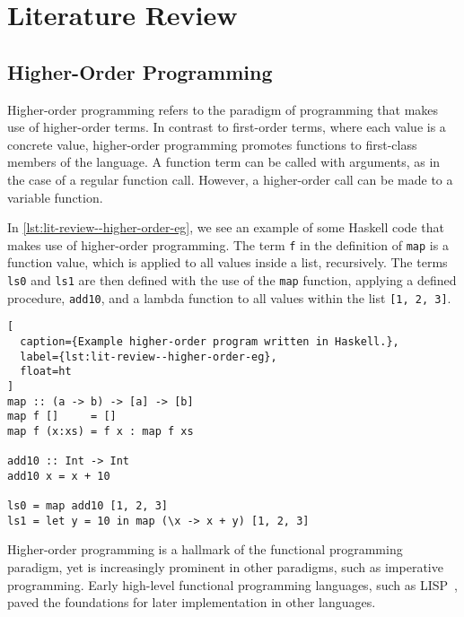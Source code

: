 \clearpage

\def\chaptertitle{Literature Review}

\lhead{\emph{\chaptertitle}}

\chapter{\chaptertitle}
\label{ch:lit-review}

\section{Higher-Order Programming}
\label{sec:lit-review--higher-order-programming}

Higher-order programming refers to the paradigm of programming that makes use of higher-order terms. In contrast to first-order terms, where each value is a concrete value, higher-order programming promotes functions to first-class members of the language. A function term can be called with arguments, as in the case of a regular function call. However, a higher-order call can be made to a variable function. 

In \cref{lst:lit-review--higher-order-eg}, we see an example of some Haskell code that makes use of higher-order programming. The term \texttt{f} in the definition of \texttt{map} is a function value, which is applied to all values inside a list, recursively. The terms \texttt{ls0} and \texttt{ls1} are then defined with the use of the \texttt{map} function, applying a defined procedure, \texttt{add10}, and a lambda function to all values within the list \texttt{[1, 2, 3]}.

\begin{lstlisting}[
  caption={Example higher-order program written in Haskell.},
  label={lst:lit-review--higher-order-eg},
  float=ht
]
map :: (a -> b) -> [a] -> [b]
map f []     = []
map f (x:xs) = f x : map f xs

add10 :: Int -> Int
add10 x = x + 10

ls0 = map add10 [1, 2, 3]
ls1 = let y = 10 in map (\x -> x + y) [1, 2, 3]
\end{lstlisting}

Higher-order programming is a hallmark of the functional programming paradigm, yet is increasingly prominent in other paradigms, such as imperative programming. Early high-level functional programming languages, such as LISP~\cite{mccarthy1960recursive}, paved the foundations for later implementation in other languages.

